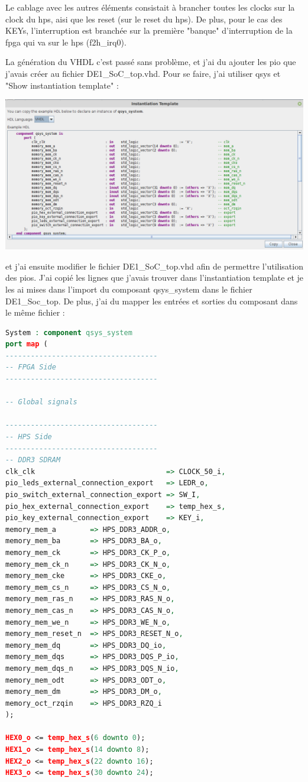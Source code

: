 Le cablage avec les autres éléments consistait à brancher toutes les clocks sur la clock du hps, aisi que les reset (sur le reset du hps). De plus, pour le cas des KEYs, l'interruption est branchée sur la première "banque" d'interruption de la fpga qui va sur le hps (f2h\_irq0).

La génération du VHDL c'est passé sans problème, et j'ai du ajouter les pio que j'avais créer au fichier DE1\_SoC\_top.vhd. Pour se faire, j'ai utiliser qsys et "Show instantiation template" : 

\includegraphics[scale=0.4]{./images/show_instantiation_template.png}

et j'ai ensuite modifier le fichier DE1\_SoC\_top.vhd afin de permettre l'utilisation des pios. J'ai copié les lignes que j'avais trouver dans l'instantiation template et je les ai mises dans l'import du composant qsys\_system dans le fichier DE1\_Soc\_top. De plus, j'ai du mapper les entrées et sorties du composant dans le même fichier : 
\begin{lstlisting}[language=VHDL]
System : component qsys_system
port map (
------------------------------------
-- FPGA Side
------------------------------------

-- Global signals

------------------------------------
-- HPS Side
------------------------------------
-- DDR3 SDRAM
clk_clk                               => CLOCK_50_i,
pio_leds_external_connection_export   => LEDR_o,
pio_switch_external_connection_export => SW_I,
pio_hex_external_connection_export    => temp_hex_s,
pio_key_external_connection_export    => KEY_i,
memory_mem_a        => HPS_DDR3_ADDR_o,
memory_mem_ba       => HPS_DDR3_BA_o,
memory_mem_ck       => HPS_DDR3_CK_P_o,
memory_mem_ck_n     => HPS_DDR3_CK_N_o,
memory_mem_cke      => HPS_DDR3_CKE_o,
memory_mem_cs_n     => HPS_DDR3_CS_N_o,
memory_mem_ras_n    => HPS_DDR3_RAS_N_o,
memory_mem_cas_n    => HPS_DDR3_CAS_N_o,
memory_mem_we_n     => HPS_DDR3_WE_N_o,
memory_mem_reset_n  => HPS_DDR3_RESET_N_o,
memory_mem_dq       => HPS_DDR3_DQ_io,
memory_mem_dqs      => HPS_DDR3_DQS_P_io,
memory_mem_dqs_n    => HPS_DDR3_DQS_N_io,
memory_mem_odt      => HPS_DDR3_ODT_o,
memory_mem_dm       => HPS_DDR3_DM_o,
memory_oct_rzqin    => HPS_DDR3_RZQ_i
);

HEX0_o <= temp_hex_s(6 downto 0);
HEX1_o <= temp_hex_s(14 downto 8);
HEX2_o <= temp_hex_s(22 downto 16);
HEX3_o <= temp_hex_s(30 downto 24);

\end{lstlisting}

